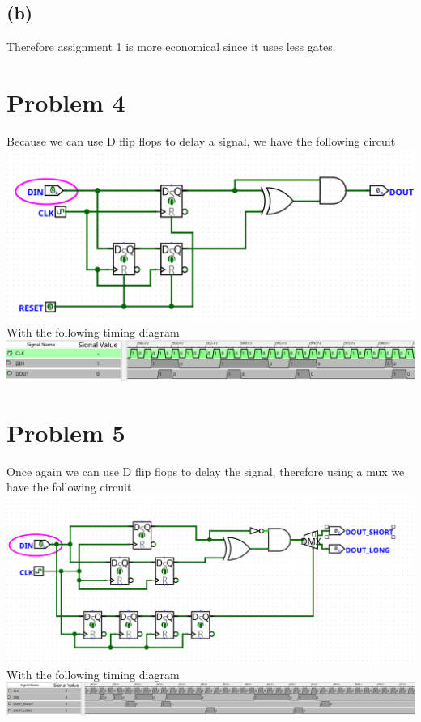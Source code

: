 \documentclass[12pt]{article}
\begin{document}
\subsection*{(b)}
Therefore assignment 1 is more economical since it uses less gates.
\section*{Problem 4}
Because we can use D flip flops to delay a signal, we have the following circuit
\\\includegraphics[scale=0.3]{Q4.png}
With the following timing diagram
\\\includegraphics[scale=0.2]{Q4timing.png}
\section*{Problem 5}
Once again we can use D flip flops to delay the signal, therefore using a mux we have the following circuit
\\\includegraphics[scale=0.27]{Q5.png}
With the following timing diagram
\\\includegraphics[scale=0.2]{Q5timing.png}
\end{document}

